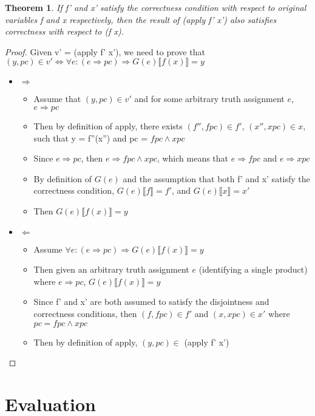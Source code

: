 \documentclass[10pt,conference]{llncs}
\begin{document}
\newtheorem{th2}{Theorem}
\begin{th2}
If f' and x' satisfy the correctness condition with respect to original variables f and x respectively, then the result of (apply f' x') also satisfies correctness with respect to (f x).
\end{th2}

\begin{proof}
Given v' = (apply f' x'), we need to prove that $(y, pc) \in v' \Leftrightarrow \forall e:{(e \Rightarrow pc) \Rightarrow G(e) \llbracket f(x) \rrbracket = y}$
\begin{itemize}
\item{$\Rightarrow$}
	\begin{itemize}
	\item Assume that $(y,pc) \in v'$ and for some arbitrary truth assignment $e$, $e \Rightarrow pc$
	\item Then by definition of apply, there exists $(f'', fpc) \in f'$, $(x'', xpc) \in x$, such that y = f''(x'') and pc = $fpc \wedge xpc$
	\item Since $e \Rightarrow pc$, then $e \Rightarrow fpc \wedge xpc$, which means that $e \Rightarrow fpc$ and $e \Rightarrow xpc$
	\item By definition of $G(e)$ and the assumption that both f' and x' satisfy the correctness condition, $G(e) \llbracket f \rrbracket = f'$, and $G(e) \llbracket x \rrbracket = x'$
	\item Then $G(e) \llbracket f(x) \rrbracket = y$
	\end{itemize}
\item{$\Leftarrow$}
	\begin{itemize}
	\item Assume $\forall e:{(e \Rightarrow pc) \Rightarrow G(e) \llbracket f(x) \rrbracket = y}$
	\item Then given an arbitrary truth assignment $e$ (identifying a single product) where $e \Rightarrow pc$, $G(e) \llbracket f(x) \rrbracket = y$
	\item Since f' and x' are both assumed to satisfy the disjointness and correctness conditions, then $(f,fpc) \in f'$ and $(x,xpc) \in x'$ where $pc = fpc \wedge xpc$
	\item Then by definition of apply, $(y,pc) \in$ (apply f' x')
	\end{itemize}
\end{itemize}

\end{proof}

\section{Evaluation}
\end{document}
